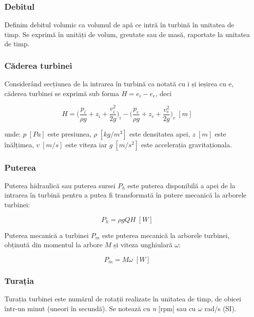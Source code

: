 \subsubsection{Debitul}

Definim debitul volumic ca volumul de apă ce intră în turbină în unitatea de timp. Se exprimă în unități de volum, greutate sau de masă, raportate la unitatea de timp.


\subsubsection{Căderea turbinei}

Considerând secțiunea de la intrarea în turbină ca notată cu i și ieșirea cu e, căderea turbinei se exprimă sub forma $H=e_i-e_e$, deci

\begin{equation}
H=\bigg(\frac{p_i}{{\rho}g}+z_i+\frac{v_i^2}{2g}\bigg)_i-\bigg(\frac{p_e}{{\rho}g}+z_e+\frac{v_e^2}{2g}\bigg)_e \;[\si{m}]
\end{equation}

unde: $p\;[\si{Pa}]$ este presiunea, ${\rho}\;[\si{kg/m^3}]$ este densitatea apei, $z\;[\si{m}]$ este înălțimea, $v\;[\si{m/s}]$ este viteza iar $g\;[\si{m/s^2}]$ este accelerația gravitaționala.

\subsubsection{Puterea}

Puterea hidraulică sau puterea sursei $P_h$ este puterea disponibilă a apei de la intrarea în turbină pentru a putea fi transformată în putere mecanică la arborele turbinei:

\begin{equation}
P_h={\rho}gQH\; [\si{W}]
\end{equation}

Puterea mecanică a turbinei $P_m$ este puterea mecanică la arborele turbinei, obținută din momentul la arbore $M$ și viteza unghiulară $\omega$:

\begin{equation}
P_m=M{\omega}\; [\si{W}]
\end{equation}

\subsubsection{Turația}

Turația turbinei este numărul de rotații realizate în unitatea de timp, de obicei într-un minut (uneori în secundă). Se notează cu \textit{n} [rpm] sau cu \(\omega\) rad/s (SI).


